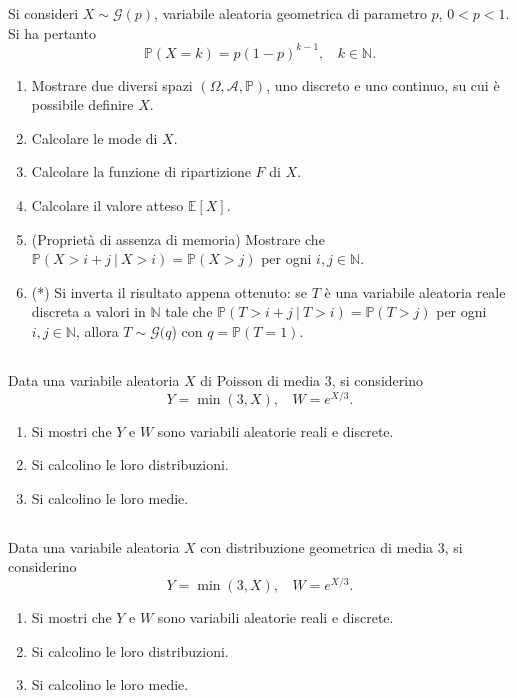 Si consideri $X\sim \mathcal{G}( p)$, variabile aleatoria geometrica di parametro $p$, $0< p< 1$. Si ha pertanto
\begin{equation*}
\mathbb{P}( X=k) =p( 1-p)^{k-1} ,\ \ \ \ k\in \mathbb{N} .
\end{equation*}
\begin{enumerate}
\item Mostrare due diversi spazi $( \Omega ,\mathcal{A} ,\mathbb{P})$, uno discreto e uno continuo, su cui è possibile definire $X$.
\item Calcolare le mode di $X$.
\item Calcolare la funzione di ripartizione $F$ di $X$.
\item Calcolare il valore atteso $\mathbb{E}[ X]$.
\item (Proprietà di assenza di memoria) Mostrare che $\mathbb{P}( X >i+j\ |\ X >i) =\mathbb{P}( X >j)$ per ogni $i,j\in \mathbb{N}$.
\item (*) Si inverta il risultato appena ottenuto: se $T$ è una variabile aleatoria reale discreta a valori in $\mathbb{N}$ tale che $\mathbb{P}( T >i+j\ |\ T >i) =\mathbb{P}( T >j)$ per ogni $i,j\in \mathbb{N}$, allora $T\sim \mathcal{G}( q$) con $q=\mathbb{P}( T=1)$.
\end{enumerate}
\subsection{}

Data una variabile aleatoria $X$ di Poisson di media $3$, si considerino
\begin{equation*}
Y=\min( 3,X) ,\ \ \ \ W=e^{X/3} .
\end{equation*}
\begin{enumerate}
\item Si mostri che $Y$ e $W$ sono variabili aleatorie reali e discrete.
\item Si calcolino le loro distribuzioni.
\item Si calcolino le loro medie.
\end{enumerate}
\subsection{}

Data una variabile aleatoria $X$ con distribuzione geometrica di media $3$, si considerino
\begin{equation*}
Y=\min( 3,X) ,\ \ \ \ W=e^{X/3} .
\end{equation*}
\begin{enumerate}
\item Si mostri che $Y$ e $W$ sono variabili aleatorie reali e discrete.
\item Si calcolino le loro distribuzioni.
\item Si calcolino le loro medie.
\end{enumerate}

